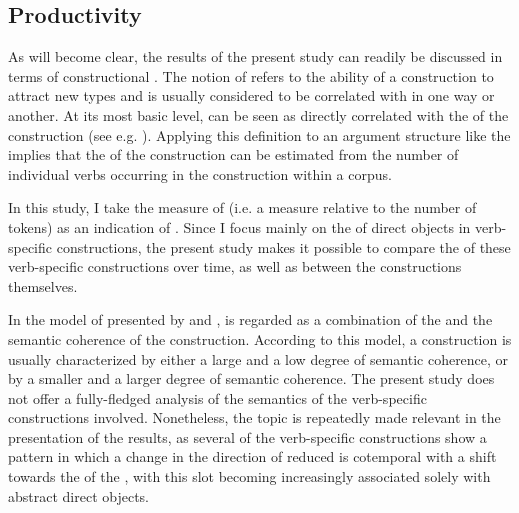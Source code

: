 \documentclass[output=paper]{langscibook}
\begin{document}
\subsection{Productivity}\label{sec:valdeson:3.2}


As will become clear, the results of the present study can readily be discussed in terms of constructional . The notion of  refers to the ability of a construction to attract new types and is usually considered to be correlated with  in one way or another. At its most basic level,  can be seen as directly correlated with the  of the construction (see e.g. \citealt{Bybee2010}). Applying this definition to an argument structure like the  implies that the  of the construction can be estimated from the number of individual verbs occurring in the construction within a corpus.



In this study, I take the measure of  (i.e. a  measure relative to the number of tokens) as an indication of . Since I focus mainly on the  of direct objects in verb-specific constructions, the present study makes it possible to compare the  of these verb-specific constructions over time, as well as between the constructions themselves.



In the model of  presented by \textcite{Bardal2008} and  \citet{BardalGildea2015},  is regarded as a combination of the  and the semantic coherence of the construction. According to this model, a  construction is usually characterized by either a large  and a low degree of semantic coherence, or by a smaller  and a larger degree of semantic coherence. The present study does not offer a fully-fledged analysis of the semantics of the verb-specific constructions involved. Nonetheless, the topic is repeatedly made relevant in the presentation of the results, as several of the verb-specific constructions show a pattern in which a change in the direction of reduced  is cotemporal with a shift towards the  of the , with this slot becoming increasingly associated solely with abstract direct objects.
\end{document}
